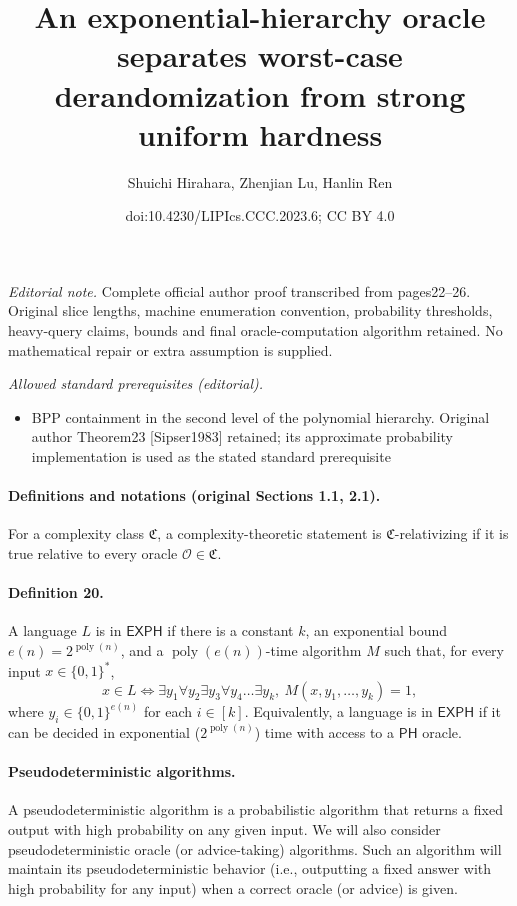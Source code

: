 \documentclass[10pt,a4paper]{article}
\title{An exponential-hierarchy oracle separates worst-case derandomization from strong uniform hardness}
\author{Shuichi Hirahara, Zhenjian Lu, Hanlin Ren}
\date{doi:10.4230/LIPIcs.CCC.2023.6; CC BY 4.0}
\begin{document}
\maketitle
\noindent\textit{Editorial note.} Complete official author proof transcribed from pages22–26. Original slice lengths, machine enumeration convention, probability thresholds, heavy-query claims, bounds and final oracle-computation algorithm retained. No mathematical repair or extra assumption is supplied.\par\medskip
\noindent\textit{Allowed standard prerequisites (editorial).}\begin{itemize}
\item BPP containment in the second level of the polynomial hierarchy. Original author Theorem23 [Sipser1983] retained; its approximate probability implementation is used as the stated standard prerequisite
\end{itemize}\medskip
\paragraph{Definitions and notations (original Sections 1.1, 2.1).}
For a complexity class $\mathfrak C$, a complexity-theoretic statement is $\mathfrak C$-relativizing if it is true relative to every oracle $\mathcal O\in\mathfrak C$.
\paragraph{Definition 20.} A language $L$ is in $\mathsf{EXPH}$ if there is a constant $k$, an exponential bound $e(n)=2^{\operatorname{poly}(n)}$, and a $\operatorname{poly}(e(n))$-time algorithm $M$ such that, for every input $x\in\{0,1\}^*$,
\[x\in L\Longleftrightarrow\exists y_1\forall y_2\exists y_3\forall y_4\ldots\exists y_k,\ M(x,y_1,\ldots,y_k)=1,\]
where $y_i\in\{0,1\}^{e(n)}$ for each $i\in[k]$. Equivalently, a language is in $\mathsf{EXPH}$ if it can be decided in exponential ($2^{\operatorname{poly}(n)}$) time with access to a $\mathsf{PH}$ oracle.
\paragraph{Pseudodeterministic algorithms.} A pseudodeterministic algorithm is a probabilistic algorithm that returns a fixed output with high probability on any given input. We will also consider pseudodeterministic oracle (or advice-taking) algorithms. Such an algorithm will maintain its pseudodeterministic behavior (i.e., outputting a fixed answer with high probability for any input) when a correct oracle (or advice) is given.
\end{document}
